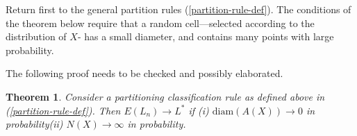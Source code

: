 \documentclass[11pt,twoside]{article}%
\theoremstyle{change}
\newtheorem{theorem}{Theorem}[section]
\newenvironment{quote-env}{\begin{quote}\sffamily }{\end{quote}}
\newenvironment{mycomments-env}[1][Mycomments]{\textbf{#1.} \begin{quote-env} }{ \end{quote-env}  \ \rule{0.5em}{0.5em}}
\begin{document}
\bigskip

Return first to the general partition rules (\ref{partition-rule-def}). The
conditions of the theorem below require that a random cell---selected
according to the distribution of $X$- has a small diameter, and contains many
points with large probability.%

\begin{mycomments}%


\begin{mycomments-env}
The following proof needs to be checked and possibly elaborated.
\end{mycomments-env}%

\end{mycomments}%


\begin{theorem}
\label{theor-consist-partitionrules}Consider a partitioning classification
rule as defined above in (\ref{partition-rule-def}). Then $E\left(
L_{n}\right)  \rightarrow L^{\ast}$ if \newline(i) $\mathrm{diam}%
(A(X))\rightarrow0$ in probability\newline(ii) $N(X)\rightarrow\infty$ in probability.
\end{theorem}
\end{document}
